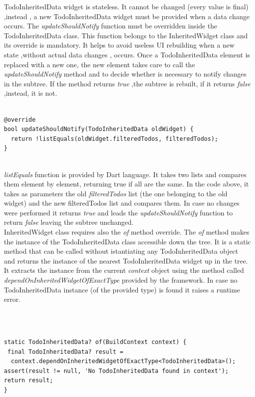 TodoInheritedData widget is stateless. It cannot be changed (every value is final) ,instead , a new TodoInheritedData widget must be provided when a data change occurs. 
The \textit{updateShouldNotify }function must be overridden inside the TodoInheritedData class. This function belongs to the InheritedWidget class and its override is mandatory. It helps to avoid useless UI rebuilding when a new state ,without actual data changes , occurs. Once a TodoInheritedData element is replaced with a new one, the new element takes care to call the \textit{updateShouldNotify }method and to decide whether is necessary to notify changes in the subtree. If the method returns \textit{true },the subtree is rebuilt, if  it returns \textit{false} ,instead, it is not.
\mbox{}\\

 \mbox{}

\begin{verbatim}

@override
bool updateShouldNotify(TodoInheritedData oldWidget) {
  return !listEquals(oldWidget.filteredTodos, filteredTodos);
}
\end{verbatim}
\mbox{}\\

\textit{listEquals }function is provided by Dart language. It takes two lists and compares them element by element, returning true if all are the same. In the code above, it takes as parameters the old \textit{filteredTodos} list (the one belonging to the old widget)  and the new filteredTodos list and compares them. In case no changes were performed it returns \textit{true} and leads the \textit{updateShouldNotify }function to return \textit{false} leaving the subtree unchanged.\\


InheritedWidget class requires also the \textit{of} method override. The \textit{of }method makes the instance of the TodoInheritedData class accessible down the tree. It is a static method that can be called without istantiating any TodoInheritedData object and returns the instance of the nearest TodoInheritedData widget up in the tree. It extracts the instance from the current \textit{context} object using the method called \textit{dependOnInheritedWidgetOfExactType} provided by the framework. In case no TodoInheritedData instance (of the provided type) is found it raises a runtime error.

\mbox{}\\
 \mbox{}
\begin{verbatim}

static TodoInheritedData? of(BuildContext context) {
 final TodoInheritedData? result =
  context.dependOnInheritedWidgetOfExactType<TodoInheritedData>(); 
assert(result != null, 'No TodoInheritedData found in context');
return result;
}
\end{verbatim}
\mbox{}\\

